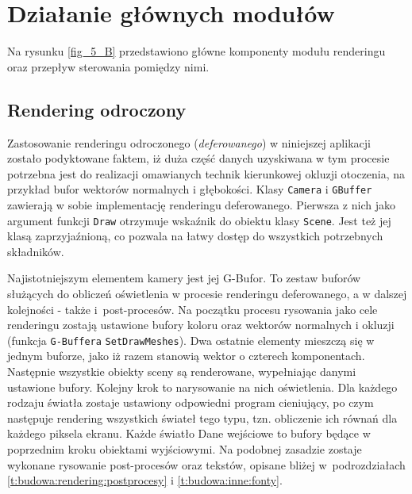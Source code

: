 	\section{Działanie głównych modułów}
	\label{t:budowa:rendering}
			
	
		Na rysunku \ref{fig_5_B} przedstawiono główne komponenty modułu renderingu oraz przepływ sterowania pomiędzy nimi.
		
	
		\subsection{Rendering odroczony}
		\label{t:budowa:rendering:rendering}
		
		
		Zastosowanie renderingu odroczonego (\emph{deferowanego}) w niniejszej aplikacji zostało podyktowane faktem, iż duża część danych uzyskiwana w tym procesie potrzebna jest do realizacji omawianych technik kierunkowej okluzji otoczenia, na przykład bufor wektorów normalnych i głębokości. Klasy \texttt{Camera} i \texttt{GBuffer} zawierają w sobie implementację renderingu deferowanego. Pierwsza z nich jako argument funkcji \texttt{Draw} otrzymuje wskaźnik do obiektu klasy \texttt{Scene}. Jest też jej klasą zaprzyjaźnioną, co pozwala na łatwy dostęp do wszystkich potrzebnych składników.
		
		Najistotniejszym elementem kamery jest jej G-Bufor. To zestaw buforów służących do obliczeń oświetlenia w procesie renderingu deferowanego, a w dalszej kolejności - także i~post-procesów. Na początku procesu rysowania jako cele renderingu zostają ustawione bufory koloru oraz wektorów normalnych i okluzji (funkcja \texttt{G-Buffera} \texttt{SetDrawMeshes}). Dwa ostatnie elementy mieszczą się w jednym buforze, jako iż razem stanowią wektor o czterech komponentach. Następnie wszystkie obiekty sceny są renderowane, wypełniając danymi ustawione bufory. Kolejny krok to narysowanie na nich oświetlenia. Dla każdego rodzaju światła zostaje ustawiony odpowiedni program cieniujący, po czym następuje rendering wszystkich świateł tego typu, tzn. obliczenie ich równań dla każdego piksela ekranu. Każde światło  Dane wejściowe to bufory będące w poprzednim kroku obiektami wyjściowymi. Na podobnej zasadzie zostaje wykonane rysowanie post-procesów oraz tekstów, opisane bliżej w~podrozdziałach \ref{t:budowa:rendering:postprocesy} i \ref{t:budowa:inne:fonty}.
		
